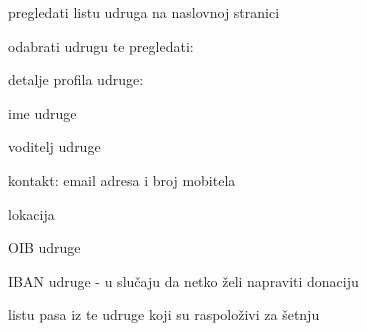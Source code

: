 			
			\begin{packed_enum}
				\item  {}
				
				\begin{packed_enum}
					
					\item pregledati listu udruga na naslovnoj stranici
					\item odabrati udrugu te pregledati: 
					\begin{packed_enum}
						
						\item  detalje profila udruge:
						\begin{packed_enum}
							\item ime udruge
							\item voditelj udruge
							\item kontakt: email adresa i broj mobitela
							\item lokacija
							\item OIB udruge
							\item IBAN udruge - u slučaju da netko želi napraviti donaciju
						\end{packed_enum}
						\item  listu pasa iz te udruge koji su raspoloživi za šetnju
					\end{packed_enum}
				

\end{packed_enum}
\end{packed_enum}

